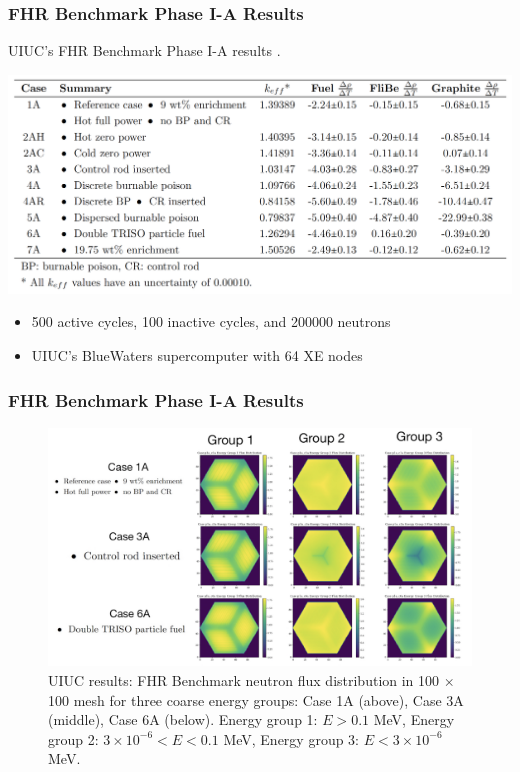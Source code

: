 \begin{frame}
    \frametitle{FHR Benchmark Phase I-A Results}
    \begin{table}
        \caption{UIUC's FHR Benchmark Phase I-A results 
        \cite{chee_arfcfhr-benchmark_2021}.}
        \includegraphics[width=\linewidth]{figures/benchmark-coeff-results.png} 
    \end{table}
    \begin{itemize}
        \item 500 active cycles, 100 inactive cycles, and 200000 neutrons
        \item UIUC's BlueWaters supercomputer with 64 XE nodes
    \end{itemize}
\end{frame}

\begin{frame}
    \frametitle{FHR Benchmark Phase I-A Results}
    \begin{figure}[]
        \centering
        \includegraphics[width=0.9\linewidth]{figures/phase1a-e.png} 
        \vspace{-0.2cm}
        \caption{UIUC results: FHR Benchmark neutron flux 
        distribution in 100 $\times$ 100 mesh for three coarse energy groups: Case 
        1A (above), Case 3A (middle), Case 6A (below). Energy group 1: $E > 0.1$ MeV, 
        Energy group 2: $3 \times 10^{-6} < E < 0.1$ MeV, Energy group 3: $E < 3 \times 10^{-6}$ MeV. }
    \end{figure}
\end{frame}

